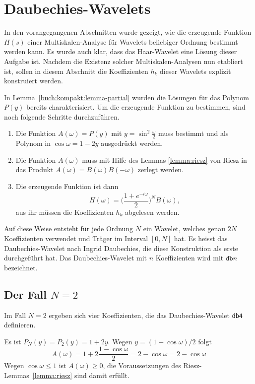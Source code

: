 %
%
%
\section{Daubechies-Wavelets\label{section:daubechies}}
In den vorangegangenen Abschnitten wurde gezeigt, wie die erzeugende
Funktion $H(s)$ einer Multi\-skalen-Analyse für Wavelets beliebiger
Ordnung bestimmt werden kann.
Es wurde auch klar, dass das Haar-Wavelet eine Lösung dieser Aufgabe
ist.
Nachdem die Existenz solcher Multiskalen-Ana\-ly\-sen nun etabliert ist,
sollen in diesem Abschnitt die Koeffizienten $h_k$ dieser Wavelets
explizit konstruiert werden.

In Lemma~\ref{buch:kompakt:lemma-partial} wurden die Lösungen für das
Polynom $P(y)$ bereits charakterisiert.
Um die erzeugende Funktion zu bestimmen, sind noch folgende Schritte
durchzuführen.
\begin{enumerate}
\item
Die Funktion $A(\omega)=P(y)$ mit $y=\sin^2\frac{\omega}2$ muss
bestimmt und als Polynom in $\cos\omega=1-2y$ ausgedrückt werden.
\item
Die Funktion $A(\omega)$ muss mit Hilfe des Lemmas \ref{lemma:riesz}
von Riesz in das Produkt $A(\omega)=B(\omega)B(-\omega)$ zerlegt
werden.
\item
Die erzeugende Funktion ist dann
\[
H(\omega)
=
\biggl(
\frac{1+e^{-i\omega}}2
\biggr)^N
B(\omega),
\]
aus ihr müssen die Koeffizienten $h_k$ abgelesen werden.
\end{enumerate}
Auf diese Weise entsteht für jede Ordnung $N$ ein Wavelet, welches
genau $2N$ Koeffizienten verwendet und Träger im Interval
$[0,N]$ hat.
Es heisst das Daubechies-Wavelet
nach Ingrid Daubechies, die diese Konstruktion als erste durchgeführt hat.
Das Daubechies-Wavelet mit $n$ Koeffizienten wird mit $\texttt{db}n$
bezeichnet.

\subsection{Der Fall $N=2$}
Im Fall $N=2$ ergeben sich vier Koeffizienten, die das Daubechies-Wavelet
\texttt{db4} definieren.
%

Es ist $P_N(y)=P_2(y)=1+2y$.
Wegen $y=(1-\cos \omega)/2$ folgt
\[
A(\omega) = 1 + 2\frac{1-\cos\omega}2 = 2-\cos\omega
= 2- \cos\omega
\]
Wegen $\cos\omega\le 1$ ist $A(\omega) \ge 0$, die Voraussetzungen des
Riesz-Lemmas~\ref{lemma:riesz} sind damit erfüllt.

